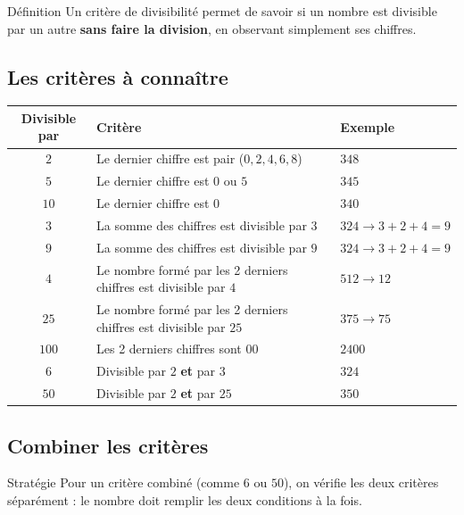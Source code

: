 \begin{regle}{Définition}
Un critère de divisibilité permet de savoir si un nombre est divisible par un autre \textbf{sans faire la division}, en observant simplement ses chiffres.
\end{regle}

\vspace{10pt}
\subsection{Les critères à connaître}

\def\arraystretch{1.3}
\begin{tabularx}{\linewidth}{|c|X|X|}
\hline
\cellcolor{themeNO!30}\textbf{Divisible par} & \cellcolor{themeNO!30}\textbf{Critère} & \cellcolor{themeNO!30}\textbf{Exemple} \\\hline
$2$ & Le dernier chiffre est pair ($0,2,4,6,8$) & $348$ \\\hline
$5$ & Le dernier chiffre est $0$ ou $5$ & $345$ \\\hline
$10$ & Le dernier chiffre est $0$ & $340$ \\\hline
$3$ & La somme des chiffres est divisible par $3$ & $324 \to 3{+}2{+}4=9$ \\\hline
$9$ & La somme des chiffres est divisible par $9$ & $324 \to 3{+}2{+}4=9$ \\\hline
$4$ & Le nombre formé par les 2 derniers chiffres est divisible par $4$ & $512 \to 12$ \\\hline
$25$ & Le nombre formé par les 2 derniers chiffres est divisible par $25$ & $375 \to 75$ \\\hline
$100$ & Les 2 derniers chiffres sont $00$ & $2400$ \\\hline
$6$ & Divisible par $2$ \textbf{et} par $3$ & $324$ \\\hline
$50$ & Divisible par $2$ \textbf{et} par $25$ & $350$ \\\hline
\end{tabularx}
\def\arraystretch{1}

\vspace{10pt}
\subsection{Combiner les critères}

\begin{astuce}{Stratégie}
Pour un critère combiné (comme $6$ ou $50$), on vérifie les deux critères séparément : le nombre doit remplir les deux conditions à la fois.
\end{astuce}


